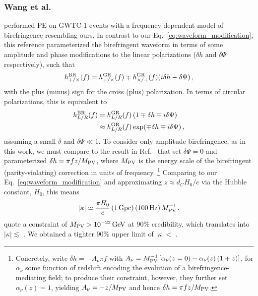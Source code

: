 \documentclass[aps,prd,twocolumn,superscriptaddress,preprintnumbers,floatfix,nofootinbib]{revtex4-2}
\begin{document}
\subsubsection{Wang et al.}

\citet{Wang_2021} performed \ac{PE} on GWTC-1 events with a frequency-dependent model of birefringence resembling ours.
In contrast to our Eq.~\eqref{eq:waveform_modification}, this reference parameterized the birefringent waveform in terms of some amplitude and phase modifications to the linear polarizations ($\delta h$ and $\delta \Psi$ respectively), such that
\begin{equation}
    h_{+/\times}^{\rm BR}(f) = h_{+/\times}^{\rm GR}(f)\mp h_{\times/+}^{\rm GR}(f)(i\delta h-\delta\Psi)\,,
\end{equation}
with the plus (minus) sign for the cross (plus) polarization.
In terms of circular polarizations, this is equivalent to 
\begin{align}
h^{\rm BR}_{L/R}(f) &= h^{\rm GR}_{L/R}(f) \left(1 \mp \delta h \mp i \delta \Psi \right) \nonumber\\
&\approx h^{\rm GR}_{L/R}(f) \exp(\mp \delta h \mp i \delta \Psi) \, ,
\end{align}
assuming a small $\delta $ and $\delta \Psi \ll 1$.
To consider only amplitude birefringence, as in this work, we must compare to the result in Ref.~\citep{Wang_2021} that set $\delta \Psi = 0$ and parameterized $\delta h = \pi f z / M_{\rm PV}$, where $M_{\rm PV}$ is the energy scale of the birefringent (parity-violating) correction in units of frequency.%
\footnote{Concretely, \citet{Wang_2021} write $\delta h = - A_\nu \pi f$ with $A_\nu = M_{\rm PV}^{-1} \left[\alpha_\nu (z=0) - \alpha_\nu(z) \left(1+z\right)\right]$, for $\alpha_\nu$ some function of redshift encoding the evolution of a birefringence-mediating field; to produce their constraint, however, they further set $\alpha_\nu(z) = 1$, yielding $A_\nu = -z / M_{\rm PV}$ and hence $\delta h = \pi f z / M_{\rm PV}$.}
Comparing to our Eq.~\eqref{eq:waveform_modification} and approximating $z \approx d_C H_0/c$ via the Hubble constant, $H_0$, this means
\begin{equation}
    |\kappa| \simeq \frac{\pi H_0}{c}\left(1\,\mathrm{Gpc}\right)\left(100\,\mathrm{Hz}\right)M_{\rm PV}^{-1}\,.
\end{equation}
\citet{Wang_2021} quote a constraint of $M_{\rm PV} > 10^{-22}\, {\rm GeV}$ at 90\% credibility, which translates into $|\kappa| \lesssim$ .
We obtained a tighter 90\% upper limit of $|\kappa| <$ .
\end{document}
